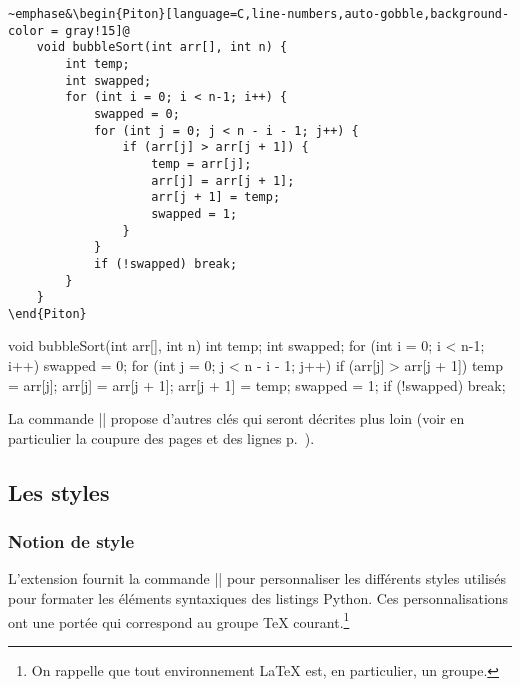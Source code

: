 \documentclass[dvipsnames,svgnames]{article}
\begin{document}
\bigskip

\begingroup
{}
\begin{Verbatim}
~emphase&\begin{Piton}[language=C,line-numbers,auto-gobble,background-color = gray!15]@
    void bubbleSort(int arr[], int n) {
        int temp;
        int swapped;
        for (int i = 0; i < n-1; i++) {
            swapped = 0;
            for (int j = 0; j < n - i - 1; j++) {
                if (arr[j] > arr[j + 1]) {
                    temp = arr[j];
                    arr[j] = arr[j + 1];
                    arr[j + 1] = temp;
                    swapped = 1; 
                }
            }
            if (!swapped) break;
        }
    }   
\end{Piton}
\end{Verbatim}
\endgroup


\begin{Piton}[language=C,line-numbers,auto-gobble,background-color = gray!15]
    void bubbleSort(int arr[], int n) {
        int temp;
        int swapped;
        for (int i = 0; i < n-1; i++) {
            swapped = 0;
            for (int j = 0; j < n - i - 1; j++) {
                if (arr[j] > arr[j + 1]) {
                    temp = arr[j];
                    arr[j] = arr[j + 1];
                    arr[j + 1] = temp;
                    swapped = 1; 
                }
            }
            if (!swapped) break;
        }
    }   
\end{Piton}




\bigskip
La commande |\PitonOptions| propose d'autres clés qui seront décrites plus loin (voir en particulier la coupure des
pages et des lignes p.~\pageref{breakable}).


\subsection{Les styles}

\label{styles}

\subsubsection{Notion de style}

L'extension  fournit la commande |\SetPitonStyle| pour personnaliser les différents styles utilisés pour
formater les éléments syntaxiques des listings Python. Ces personnalisations ont une portée qui correspond au
groupe TeX courant.\footnote{On rappelle que tout environnement LaTeX est, en particulier, un groupe.}
\end{document}
